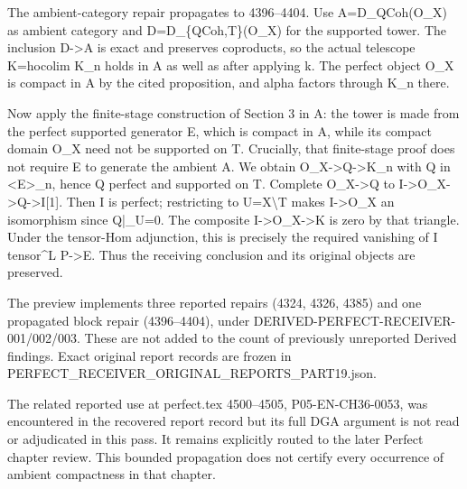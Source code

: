 \documentclass[11pt]{article}
\begin{document}
The ambient-category repair propagates to 4396–\allowbreak{}4404. Use A\allowbreak{}=D\_\allowbreak{}QCoh(O\_\allowbreak{}X)\allowbreak{} as ambient category and D\allowbreak{}=D\_\allowbreak{}\{QCoh,\allowbreak{}T\}(O\_\allowbreak{}X)\allowbreak{} for the supported tower. The inclusion D\allowbreak{}->A is exact and preserves coproducts,\allowbreak{} so the actual telescope K\allowbreak{}=hocolim K\_\allowbreak{}n holds in A as well as after applying k. The perfect object O\_\allowbreak{}X is compact in A by the cited proposition,\allowbreak{} and alpha factors through K\_\allowbreak{}n there.

Now apply the finite-stage construction of Section 3 in A:\allowbreak{} the tower is made from the perfect supported generator E,\allowbreak{} which is compact in A,\allowbreak{} while its compact domain O\_\allowbreak{}X need not be supported on T. Crucially,\allowbreak{} that finite-stage proof does not require E to generate the ambient A. We obtain O\_\allowbreak{}X\allowbreak{}->Q\allowbreak{}->K\_\allowbreak{}n with Q in <E>\_\allowbreak{}n,\allowbreak{} hence Q perfect and supported on T. Complete O\_\allowbreak{}X\allowbreak{}->Q to I\allowbreak{}->O\_\allowbreak{}X\allowbreak{}->Q\allowbreak{}->I[1]\allowbreak{}. Then I is perfect; restricting to U\allowbreak{}=X\textbackslash{}T makes I\allowbreak{}->O\_\allowbreak{}X an isomorphism since Q|\_\allowbreak{}U\allowbreak{}=0. The composite I\allowbreak{}->O\_\allowbreak{}X\allowbreak{}->K is zero by that triangle. Under the tensor-Hom adjunction,\allowbreak{} this is precisely the required vanishing of I tensor\^{}L P\allowbreak{}->E. Thus the receiving conclusion and its original objects are preserved.

The preview implements three reported repairs (4324,\allowbreak{} 4326,\allowbreak{} 4385)\allowbreak{} and one propagated block repair (4396–\allowbreak{}4404)\allowbreak{},\allowbreak{} under DERIVED-PERFECT-RECEIVER-001/\allowbreak{}002/\allowbreak{}003. These are not added to the count of previously unreported Derived findings. Exact original report records are frozen in PERFECT\_\allowbreak{}RECEIVER\_\allowbreak{}ORIGINAL\_\allowbreak{}REPORTS\_\allowbreak{}PART19.json.

The related reported use at perfect.tex 4500–\allowbreak{}4505,\allowbreak{} P05-EN-CH36-0053,\allowbreak{} was encountered in the recovered report record but its full DGA argument is not read or adjudicated in this pass. It remains explicitly routed to the later Perfect chapter review. This bounded propagation does not certify every occurrence of ambient compactness in that chapter.
\end{document}
